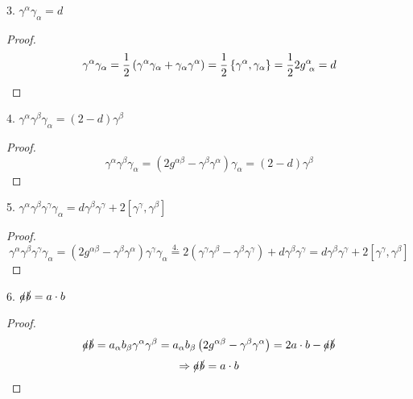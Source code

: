 3. $\gamma^{\alpha}\gamma_{\alpha} = d$
\begin{proof}
\begin{equation*}
\gamma^{\alpha}\gamma_{\alpha} = \frac{1}{2} \left( \gamma^{\alpha}\gamma_{\alpha} + \gamma_{\alpha}\gamma^{\alpha} \right) = \frac{1}{2} \left\lbrace \gamma^{\alpha}, \gamma_{\alpha} \right\rbrace = \frac{1}{2} 2 g^{\alpha}_{ \ \alpha} = d
\end{equation*}
\end{proof}

4. $\gamma^{\alpha}\gamma^{\beta}\gamma_{\alpha} = \left( 2-d \right) \gamma^{\beta}$
\begin{proof}
\begin{equation*}
\gamma^{\alpha}\gamma^{\beta}\gamma_{\alpha} = \left( 2g^{\alpha\beta} - \gamma^{\beta}\gamma^{\alpha} \right) \gamma_{\alpha} = \left( 2-d \right) \gamma^{\beta}
\end{equation*}
\end{proof}

5. $\gamma^{\alpha}\gamma^{\beta}\gamma^{\gamma}\gamma_{\alpha} = d\gamma^{\beta}\gamma^{\gamma} + 2 \left[ \gamma^{\gamma}, \gamma^{\beta} \right]$
\begin{proof}
\begin{equation*}
\gamma^{\alpha}\gamma^{\beta}\gamma^{\gamma}\gamma_{\alpha} = \left( 2g^{\alpha\beta} - \gamma^{\beta}\gamma^{\alpha} \right) \gamma^{\gamma}\gamma_{\alpha} \overset{4.}{=} 2 \left( \gamma^{\gamma}\gamma^{\beta} - \gamma^{\beta}\gamma^{\gamma} \right) + d\gamma^{\beta}\gamma^{\gamma} = d\gamma^{\beta}\gamma^{\gamma} + 2 \left[ \gamma^{\gamma}, \gamma^{\beta} \right]		
\end{equation*}
\end{proof}

6. $\slashed{a}\slashed{b} = a \cdot b$
\begin{proof}
\begin{equation*}
\slashed{a} \slashed{b} = a_{\alpha} b_{\beta} \gamma^{\alpha}\gamma^{\beta} = a_{\alpha} b_{\beta} \left( 2 g^{\alpha\beta} - \gamma^{\beta}\gamma^{\alpha} \right) = 2 a \cdot b - \slashed{a}\slashed{b}
\end{equation*}
\begin{equation*}
\Rightarrow \slashed{a}\slashed{b} = a \cdot b
\end{equation*}
\end{proof}


